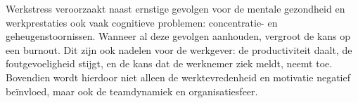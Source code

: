 \vspace{1em}Werkstress veroorzaakt naast ernstige gevolgen voor de mentale gezondheid en werkprestaties ook vaak cognitieve problemen: concentratie- en geheugenstoornissen. Wanneer al deze gevolgen aanhouden, vergroot de kans op een burnout. Dit zijn ook nadelen voor de werkgever: de productiviteit daalt, de foutgevoeligheid stijgt, en de kans dat de werknemer ziek meldt, neemt toe. Bovendien wordt hierdoor niet alleen de werktevredenheid en motivatie negatief beïnvloed, maar ook de teamdynamiek en organisatiesfeer.







